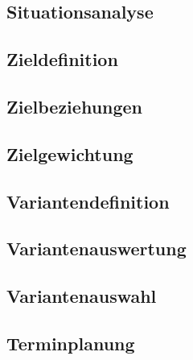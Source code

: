 \subsection{Situationsanalyse}

\subsection{Zieldefinition}

\subsection{Zielbeziehungen}

\subsection{Zielgewichtung}

\subsection{Variantendefinition}
\subsection{Variantenauswertung}
\subsection{Variantenauswahl}
\subsection{Terminplanung}
